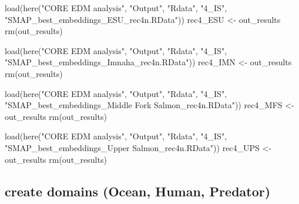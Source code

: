 \documentclass[
]{article}
\newenvironment{Shaded}{\begin{snugshade}}{\end{snugshade}}
\newcommand{\FunctionTok}[1]{\textcolor[rgb]{0.00,0.00,0.00}{#1}}
\newcommand{\NormalTok}[1]{#1}
\newcommand{\OtherTok}[1]{\textcolor[rgb]{0.56,0.35,0.01}{#1}}
\newcommand{\StringTok}[1]{\textcolor[rgb]{0.31,0.60,0.02}{#1}}
\begin{document}
\begin{Shaded}
\begin{Highlighting}[]
\FunctionTok{load}\NormalTok{(}\FunctionTok{here}\NormalTok{(}\StringTok{"CORE EDM analysis"}\NormalTok{, }\StringTok{"Output"}\NormalTok{, }\StringTok{"Rdata"}\NormalTok{, }\StringTok{"4\_IS"}\NormalTok{, }\StringTok{"SMAP\_best\_embeddings\_ESU\_rec4n.RData"}\NormalTok{)) }
\NormalTok{rec4\_ESU }\OtherTok{\textless{}{-}}\NormalTok{ out\_results}
\FunctionTok{rm}\NormalTok{(out\_results)}

\FunctionTok{load}\NormalTok{(}\FunctionTok{here}\NormalTok{(}\StringTok{"CORE EDM analysis"}\NormalTok{, }\StringTok{"Output"}\NormalTok{, }\StringTok{"Rdata"}\NormalTok{, }\StringTok{"4\_IS"}\NormalTok{, }\StringTok{"SMAP\_best\_embeddings\_Imnaha\_rec4n.RData"}\NormalTok{)) }
\NormalTok{rec4\_IMN }\OtherTok{\textless{}{-}}\NormalTok{ out\_results}
\FunctionTok{rm}\NormalTok{(out\_results)}

\FunctionTok{load}\NormalTok{(}\FunctionTok{here}\NormalTok{(}\StringTok{"CORE EDM analysis"}\NormalTok{, }\StringTok{"Output"}\NormalTok{, }\StringTok{"Rdata"}\NormalTok{, }\StringTok{"4\_IS"}\NormalTok{, }\StringTok{"SMAP\_best\_embeddings\_Middle Fork Salmon\_rec4n.RData"}\NormalTok{)) }
\NormalTok{rec4\_MFS }\OtherTok{\textless{}{-}}\NormalTok{ out\_results}
\FunctionTok{rm}\NormalTok{(out\_results)}

\FunctionTok{load}\NormalTok{(}\FunctionTok{here}\NormalTok{(}\StringTok{"CORE EDM analysis"}\NormalTok{, }\StringTok{"Output"}\NormalTok{, }\StringTok{"Rdata"}\NormalTok{, }\StringTok{"4\_IS"}\NormalTok{, }\StringTok{"SMAP\_best\_embeddings\_Upper Salmon\_rec4n.RData"}\NormalTok{)) }
\NormalTok{rec4\_UPS }\OtherTok{\textless{}{-}}\NormalTok{ out\_results}
\FunctionTok{rm}\NormalTok{(out\_results)}
\end{Highlighting}
\end{Shaded}

\hypertarget{create-domains-ocean-human-predator}{%
\subsection{create domains (Ocean, Human,
Predator)}\label{create-domains-ocean-human-predator}}
\end{document}
